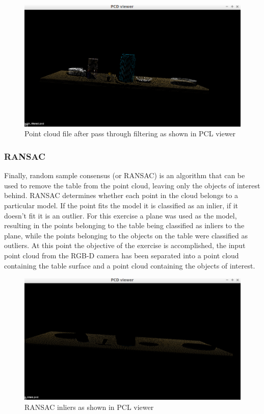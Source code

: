 \documentclass{article}
\begin{document}
\begin{figure}[H]
    \includegraphics[width=\linewidth]{ex1passthrough.png}
    \caption{Point cloud file after pass through filtering as shown in PCL viewer}
    \label{fig:passthrough}
\end{figure}

\subsubsection{RANSAC}
Finally, random sample consensus (or RANSAC) is an algorithm that can be used to remove the table from the point cloud, leaving only the objects of interest behind. RANSAC determines whether each point in the cloud belongs to a particular model. If the point fits the model it is classified as an inlier, if it doesn't fit it is an outlier. For this exercise a plane was used as the model, resulting in the points belonging to the table being classified as inliers to the plane, while the points belonging to the objects on the table were classified as outliers. At this point the objective of the exercise is accomplished, the input point cloud from the RGB-D camera has been separated into a point cloud containing the table surface and a point cloud containing the objects of interest.

\begin{figure}[H]
    \includegraphics[width=\linewidth]{ex1extractedinliers.png}
    \caption{RANSAC inliers as shown in PCL viewer}
    \label{fig:inliers}
\end{figure}
\end{document}
